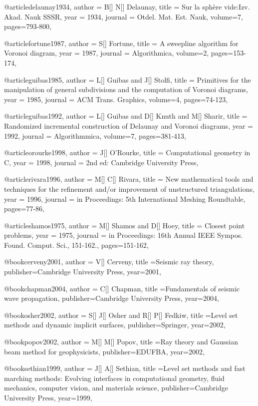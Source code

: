 {@article{delaunay1934,
  author =	 {B[] N[] Delaunay},
  title =	 {Sur la sph\`{e}re vide:Izv. Akad. Nauk SSSR},
  year =	 1934,
  journal =	 {Otdel. Mat. Est. Nauk},
  volume={7},
 pages=793-800,
}

@article{fortune1987,
  author =	 {S[] Fortune},
  title =	 {A sweepline algorithm for Voronoi diagram},
  year =	 1987,
  journal =	 {Algorithmica},
  volume={2},
 pages=153-174,
}

@article{guibas1985,
  author =	 {L[] Guibas and J[] Stolfi},
  title =	 {Primitives for the manipulation of general subdivisions and the computation of Voronoi diagrams},
  year =	 1985,
  journal =	 {ACM Trans. Graphics},
  volume={4},
 pages=74-123,
}

@article{guibas1992,
  author =	 {L[] Guibas and D[] Knuth and M[] Sharir},
  title =	 {Randomized incremental construction of Delaunay and Voronoi diagrams},
  year =	 1992,
  journal =	 {Algorithmmica},
  volume={7},
 pages=381-413,
}

@article{orourke1998,
  author =	 {J[] O'Rourke},
  title =	 {Computational geometry in C},
  year =	 1998,
  journal =	 {2nd ed: Cambridge University Press},
}

@article{rivara1996,
  author =	 {M[] C[] Rivara},
  title =	 {New mathematical tools and techniques for the refinement and/or improvement of unstructured triangulations},
  year =	 1996,
  journal =	 {in Proceedings: 5th International Meshing Roundtable},
 pages=77-86,
}

@article{shamos1975,
  author =	 {M[] Shamos and D[] Hoey},
  title =	 {Closest point problems},
  year =	 1975,
  journal =	 {in Proceedings: 16th Annual IEEE Sympos. Found. Comput. Sci., 151-162.},
  pages=151-162,
}

@book{cerveny2001,
  author = {V[] Cerveny},
  title ={Seismic ray theory},
  publisher={Cambridge University Press},
  year=2001,
}

@book{chapman2004,
  author = {C[] Chapman},
  title ={Fundamentals of seismic wave propagation},
  publisher={Cambridge University Press},
  year=2004,
}

@book{osher2002,
  author = {S[] J[] Osher and R[] P[] Fedkiw},
  title ={Level set methods and dynamic implicit surfaces},
  publisher={Springer},
  year=2002,
}

@book{popov2002,
  author = {M[] M[] Popov},
  title ={Ray theory and Gaussian beam method for geophysicists},
  publisher={EDUFBA},
  year=2002,
}

@book{sethian1999,
  author = {J[] A[] Sethian},
  title ={Level set methods and fast marching methods: Evolving interfaces in computational geometry, fluid mechanics, computer vision, and materials science},
  publisher={Cambridge University Press},
  year=1999,
}

}
